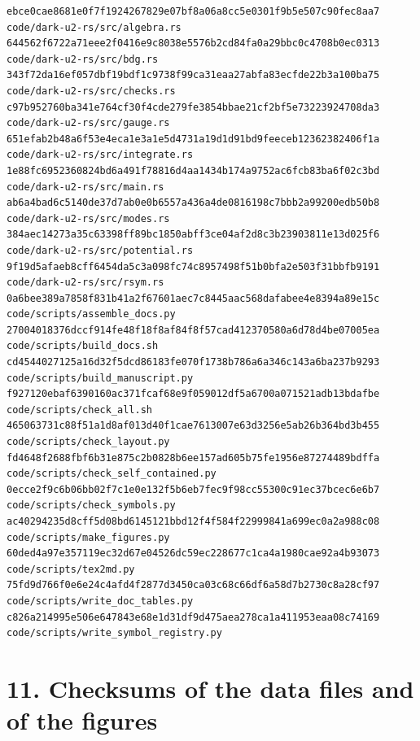 \documentclass[
  10pt,
]{article}
\begin{document}
\begin{verbatim}
ebce0cae8681e0f7f1924267829e07bf8a06a8cc5e0301f9b5e507c90fec8aa7  code/dark-u2-rs/src/algebra.rs
644562f6722a71eee2f0416e9c8038e5576b2cd84fa0a29bbc0c4708b0ec0313  code/dark-u2-rs/src/bdg.rs
343f72da16ef057dbf19bdf1c9738f99ca31eaa27abfa83ecfde22b3a100ba75  code/dark-u2-rs/src/checks.rs
c97b952760ba341e764cf30f4cde279fe3854bbae21cf2bf5e73223924708da3  code/dark-u2-rs/src/gauge.rs
651efab2b48a6f53e4eca1e3a1e5d4731a19d1d91bd9feeceb12362382406f1a  code/dark-u2-rs/src/integrate.rs
1e88fc6952360824bd6a491f78816d4aa1434b174a9752ac6fcb83ba6f02c3bd  code/dark-u2-rs/src/main.rs
ab6a4bad6c5140de37d7ab0e0b6557a436a4de0816198c7bbb2a99200edb50b8  code/dark-u2-rs/src/modes.rs
384aec14273a35c63398ff89bc1850abff3ce04af2d8c3b23903811e13d025f6  code/dark-u2-rs/src/potential.rs
9f19d5afaeb8cff6454da5c3a098fc74c8957498f51b0bfa2e503f31bbfb9191  code/dark-u2-rs/src/rsym.rs
0a6bee389a7858f831b41a2f67601aec7c8445aac568dafabee4e8394a89e15c  code/scripts/assemble_docs.py
27004018376dccf914fe48f18f8af84f8f57cad412370580a6d78d4be07005ea  code/scripts/build_docs.sh
cd4544027125a16d32f5dcd86183fe070f1738b786a6a346c143a6ba237b9293  code/scripts/build_manuscript.py
f927120ebaf6390160ac371fcaf68e9f059012df5a6700a071521adb13bdafbe  code/scripts/check_all.sh
465063731c88f51a1d8af013d40f1cae7613007e63d3256e5ab26b364bd3b455  code/scripts/check_layout.py
fd4648f2688fbf6b31e875c2b0828b6ee157ad605b75fe1956e87274489bdffa  code/scripts/check_self_contained.py
0ecce2f9c6b06bb02f7c1e0e132f5b6eb7fec9f98cc55300c91ec37bcec6e6b7  code/scripts/check_symbols.py
ac40294235d8cff5d08bd6145121bbd12f4f584f22999841a699ec0a2a988c08  code/scripts/make_figures.py
60ded4a97e357119ec32d67e04526dc59ec228677c1ca4a1980cae92a4b93073  code/scripts/tex2md.py
75fd9d766f0e6e24c4afd4f2877d3450ca03c68c66df6a58d7b2730c8a28cf97  code/scripts/write_doc_tables.py
c826a214995e506e647843e68e1d31df9d475aea278ca1a411953eaa08c74169  code/scripts/write_symbol_registry.py
\end{verbatim}

\hypertarget{checksums-of-the-data-files-and-of-the-figures}{%
\section{11. Checksums of the data files and of the
figures}\label{checksums-of-the-data-files-and-of-the-figures}}
\end{document}
